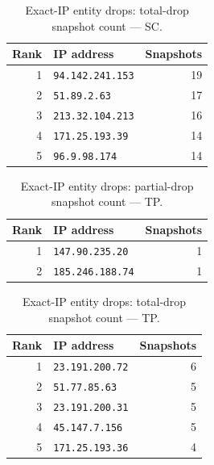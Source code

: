 \documentclass[conference]{IEEEtran}
\begin{document}
\begin{table}[H]
\caption{Exact-IP entity drops: total-drop snapshot count --- SC.}
\begin{center}\small
\begin{tabular}{|r|l|r|}
\hline
\textbf{Rank} & \textbf{IP address} & \textbf{Snapshots} \\ \hline
1 & \texttt{94.142.241.153} & 19 \\ \hline
2 & \texttt{51.89.2.63} & 17 \\ \hline
3 & \texttt{213.32.104.213} & 16 \\ \hline
4 & \texttt{171.25.193.39} & 14 \\ \hline
5 & \texttt{96.9.98.174} & 14 \\ \hline
\end{tabular}
\label{tab:ipdrop_total_static_control}
\end{center}\end{table}
 
\begin{table}[H]
\caption{Exact-IP entity drops: partial-drop snapshot count --- TP.}
\begin{center}\small
\begin{tabular}{|r|l|r|}
\hline
\textbf{Rank} & \textbf{IP address} & \textbf{Snapshots} \\ \hline
1 & \texttt{147.90.235.20} & 1 \\ \hline
2 & \texttt{185.246.188.74} & 1 \\ \hline
\end{tabular}
\label{tab:ipdrop_partial_third_party_probe}
\end{center}\end{table}
 
\begin{table}[H]
\caption{Exact-IP entity drops: total-drop snapshot count --- TP.}
\begin{center}\small
\begin{tabular}{|r|l|r|}
\hline
\textbf{Rank} & \textbf{IP address} & \textbf{Snapshots} \\ \hline
1 & \texttt{23.191.200.72} & 6 \\ \hline
2 & \texttt{51.77.85.63} & 5 \\ \hline
3 & \texttt{23.191.200.31} & 5 \\ \hline
4 & \texttt{45.147.7.156} & 5 \\ \hline
5 & \texttt{171.25.193.36} & 4 \\ \hline
\end{tabular}
\label{tab:ipdrop_total_third_party_probe}
\end{center}\end{table}
 
\end{document}
